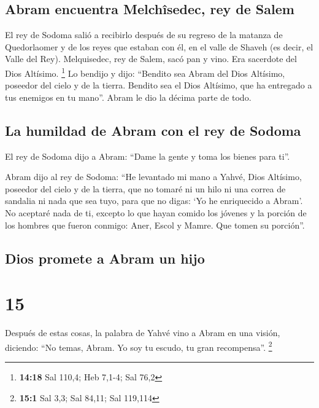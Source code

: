 \hypertarget{abram-encuentra-melchuxeesedec-rey-de-salem}{%
\subsection{Abram encuentra Melchîsedec, rey de
Salem}\label{abram-encuentra-melchuxeesedec-rey-de-salem}}

 El rey de Sodoma salió a recibirlo después de su regreso
de la matanza de Quedorlaomer y de los reyes que estaban con él, en el
valle de Shaveh (es decir, el Valle del Rey). 
Melquisedec, rey de Salem, sacó pan y vino. Era sacerdote del Dios
Altísimo. \footnote{\textbf{14:18} Sal 110,4; Heb 7,1-4; Sal 76,2}
 Lo bendijo y dijo: ``Bendito sea Abram del Dios
Altísimo, poseedor del cielo y de la tierra.  Bendito sea
el Dios Altísimo, que ha entregado a tus enemigos en tu mano''. Abram le
dio la décima parte de todo.

\hypertarget{la-humildad-de-abram-con-el-rey-de-sodoma}{%
\subsection{La humildad de Abram con el rey de
Sodoma}\label{la-humildad-de-abram-con-el-rey-de-sodoma}}

 El rey de Sodoma dijo a Abram: ``Dame la gente y toma
los bienes para ti''.

 Abram dijo al rey de Sodoma: ``He levantado mi mano a
Yahvé, Dios Altísimo, poseedor del cielo y de la tierra, 
que no tomaré ni un hilo ni una correa de sandalia ni nada que sea tuyo,
para que no digas: `Yo he enriquecido a Abram'.  No
aceptaré nada de ti, excepto lo que hayan comido los jóvenes y la
porción de los hombres que fueron conmigo: Aner, Escol y Mamre. Que
tomen su porción''.

\hypertarget{dios-promete-a-abram-un-hijo}{%
\subsection{Dios promete a Abram un
hijo}\label{dios-promete-a-abram-un-hijo}}

\hypertarget{section-14}{%
\section{15}\label{section-14}}

 Después de estas cosas, la palabra de Yahvé vino a Abram
en una visión, diciendo: ``No temas, Abram. Yo soy tu escudo, tu gran
recompensa''. \footnote{\textbf{15:1} Sal 3,3; Sal 84,11; Sal 119,114}

